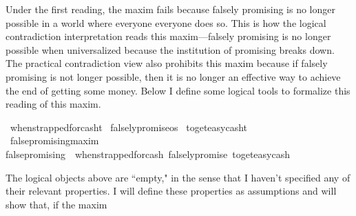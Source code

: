 \begin{isabellebody}
\begin{isamarkuptext}
Under the first reading, the maxim fails because falsely promising is no longer possible in a world where 
everyone everyone does so. This is how the logical contradiction interpretation reads this maxim—falsely 
promising is no longer possible when universalized because the institution of promising breaks down. 
The practical contradiction view also prohibits this maxim because if falsely promising is not longer 
possible, then it is no longer an effective way to achieve the end of getting some money. Below I 
define some logical tools to formalize this reading of this maxim.%
\end{isamarkuptext}\isamarkuptrue%
\isamarkupfalse%
\ when{\isacharunderscore}strapped{\isacharunderscore}for{\isacharunderscore}cash{\isacharcolon}{\isacharcolon}t\isanewline
%
\isanewline
{}\isamarkupfalse%
\ falsely{\isacharunderscore}promise{\isacharcolon}{\isacharcolon}os\isanewline
%
\isanewline
{}\isamarkupfalse%
\ to{\isacharunderscore}get{\isacharunderscore}easy{\isacharunderscore}cash{\isacharcolon}{\isacharcolon}t\isanewline
%
\isanewline
\isanewline
{}\isamarkupfalse%
\ false{\isacharunderscore}promising{\isacharcolon}{\isacharcolon}maxim\ \ \isanewline
{\isachardoublequoteopen}false{\isacharunderscore}promising\ {\isasymequiv}\ {\isacharparenleft}when{\isacharunderscore}strapped{\isacharunderscore}for{\isacharunderscore}cash{\isacharcomma}\ falsely{\isacharunderscore}promise{\isacharcomma}\ to{\isacharunderscore}get{\isacharunderscore}easy{\isacharunderscore}cash{\isacharparenright}{\isachardoublequoteclose}\isanewline
%
%
\begin{isamarkuptext}%
The logical objects above are ``empty," in the sense that I haven't specified any of their 
relevant properties. I will define these properties as assumptions and will show that, if the maxim 

\end{isamarkuptext}
\end{isabellebody}
